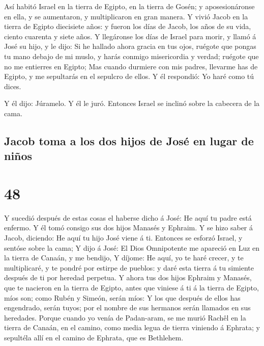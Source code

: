  Así habitó Israel en la tierra de Egipto, en la tierra
de Gosén; y aposesionáronse en ella, y se aumentaron, y multiplicaron en
gran manera.  Y vivió Jacob en la tierra de Egipto
diecisiete años: y fueron los días de Jacob, los años de su vida, ciento
cuarenta y siete años.  Y llegáronse los días de Israel
para morir, y llamó á José su hijo, y le dijo: Si he hallado ahora
gracia en tus ojos, ruégote que pongas tu mano debajo de mi muslo, y
harás conmigo misericordia y verdad; ruégote que no me entierres en
Egipto;  Mas cuando durmiere con mis padres, llevarme has
de Egipto, y me sepultarás en el sepulcro de ellos. Y él respondió: Yo
haré como tú dices.

 Y él dijo: Júramelo. Y él le juró. Entonces Israel se
inclinó sobre la cabecera de la cama.

\hypertarget{jacob-toma-a-los-dos-hijos-de-josuxe9-en-lugar-de-niuxf1os}{%
\subsection{Jacob toma a los dos hijos de José en lugar de
niños}\label{jacob-toma-a-los-dos-hijos-de-josuxe9-en-lugar-de-niuxf1os}}

\hypertarget{section-01-48}{%
\section{48}\label{section-01-48}}

 Y sucedió después de estas cosas el haberse dicho á José:
He aquí tu padre está enfermo. Y él tomó consigo sus dos hijos Manasés y
Ephraim.  Y se hizo saber á Jacob, diciendo: He aquí tu
hijo José viene á ti. Entonces se esforzó Israel, y sentóse sobre la
cama;  Y dijo á José: El Dios Omnipotente me apareció en
Luz en la tierra de Canaán, y me bendijo,  Y díjome: He
aquí, yo te haré crecer, y te multiplicaré, y te pondré por estirpe de
pueblos: y daré esta tierra á tu simiente después de ti por heredad
perpetua.  Y ahora tus dos hijos Ephraim y Manasés, que te
nacieron en la tierra de Egipto, antes que viniese á ti á la tierra de
Egipto, míos son; como Rubén y Simeón, serán míos:  Y los
que después de ellos has engendrado, serán tuyos; por el nombre de sus
hermanos serán llamados en sus heredades.  Porque cuando
yo venía de Padan-aram, se me murió Rachêl en la tierra de Canaán, en el
camino, como media legua de tierra viniendo á Ephrata; y sepultéla allí
en el camino de Ephrata, que es Bethlehem.

